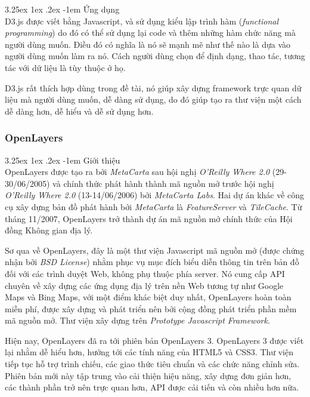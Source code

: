 \documentclass[12pt,a4paper]{article}
\makeatletter
\newcommand{\myparagraph}[1]{\paragraph{#1}\mbox{}\\} %
\renewcommand\paragraph{\@startsection{paragraph}{5}{\z@}%
  {3.25ex \@plus1ex \@minus.2ex}%
  {-1em}%
  {\normalfont\normalsize\bfseries}}
\makeatother
\begin{document}
\myparagraph{Ứng dụng}
D3.js được viết bằng Javascript, và sử dụng kiểu lập trình hàm (\textit{functional programming}) do đó có thể sử dụng lại code và thêm những hàm chức năng mà người dùng muốn. Điều đó có nghĩa là nó sẽ mạnh mẽ như thế nào là dựa vào người dùng muốn làm ra nó. Cách người dùng chọn để định dạng, thao tác, tương tác với dữ liệu là tùy thuộc ở họ.

D3.js rất thích hợp dùng trong đề tài, nó giúp xây dựng framework trực quan dữ liệu mà người dùng muốn, dễ dàng sử dụng, do đó giúp tạo ra thư viện một cách dễ dàng hơn, dễ hiểu và dễ sử dụng hơn.

\subsubsection{OpenLayers}
\myparagraph{Giới thiệu}
OpenLayers\cite{ol} được tạo ra bởi \textit{MetaCarta} sau hội nghị \textit{O'Reilly Where 2.0} (29-30/06/2005) và chính thức phát hành thành mã nguồn mở trước hội nghị  \textit{O'Reilly Where 2.0} (13-14/06/2006) bởi \textit{MetaCarta Labs}. Hai dự án khác về công cụ xây dựng bản đồ phát hành bởi \textit{MetaCarta} là \textit{FeatureServer} và \textit{TileCache}. Từ tháng 11/2007, OpenLayers trở thành dự án mã nguồn mở chính thức của Hội đồng Không gian địa lý.

Sơ qua về OpenLayers, đây là một thư viện Javascript mã nguồn mở (được chứng nhận bởi \textit{BSD License}) nhằm phục vụ mục đích biểu diễn thông tin trên bản đồ  đối với các trình duyệt Web, không phụ thuộc phía server. Nó cung cấp API chuyên về xây dựng các ứng dụng địa lý trên nền Web tương tự như Google Maps và Bing Maps, với một điểm khác biệt duy nhất, OpenLayers hoàn toàn miễn phí, được xây dựng và phát triển nên bởi cộng đồng phát triển phần mềm mã nguồn mở. Thư viện xây dựng trên \textit{Prototype Javascript Framework}\citep{prototypejs}.

Hiện nay, OpenLayers đã ra tới phiên bản OpenLayers 3. OpenLayers 3 được viết lại nhằm dễ hiểu hơn, hướng tới các tính năng của HTML5 và CSS3. Thư viện tiếp tục hỗ trợ trình chiếu, các giao thức tiêu chuẩn và các chức năng chỉnh sửa. Phiên bản mới này tập trung vào cải thiện hiệu năng, xây dựng đơn giản hơn, các thành phần trở nên trực quan hơn, API được cải tiến và còn nhiều hơn nữa.
\end{document}
